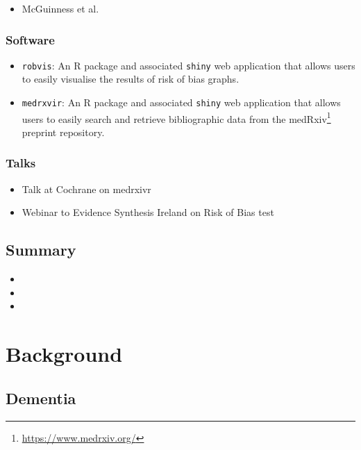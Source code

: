 \documentclass[a4paper, nobind]{templates/ociamthesis}
\providecommand{\tightlist}{%
  \setlength{\itemsep}{0pt}\setlength{\parskip}{0pt}}
\begin{document}
\begin{itemize}
\tightlist
\item
  McGuinness et al.~
\end{itemize}

\hypertarget{software}{%
\subsection{Software}\label{software}}

\begin{itemize}
\item
  \texttt{robvis}: An R package and associated \texttt{shiny} web application that allows users to easily visualise the results of risk of bias graphs.
\item
  \texttt{medrxvir}: An R package and associated \texttt{shiny} web application that allows users to easily search and retrieve bibliographic data from the medRxiv\footnote{\url{https://www.medrxiv.org/}} preprint repository.
\end{itemize}

\hypertarget{talks}{%
\subsection{Talks}\label{talks}}

\begin{itemize}
\tightlist
\item
  Talk at Cochrane on medrxivr
\item
  Webinar to Evidence Synthesis Ireland on Risk of Bias test
\end{itemize}

\hypertarget{summary}{%
\section{Summary}\label{summary}}

\begin{itemize}
\item
\item
\item
\end{itemize}

\hypertarget{background-heading}{%
\chapter{Background}\label{background-heading}}

\hypertarget{dementia}{%
\section{Dementia}\label{dementia}}
\end{document}
